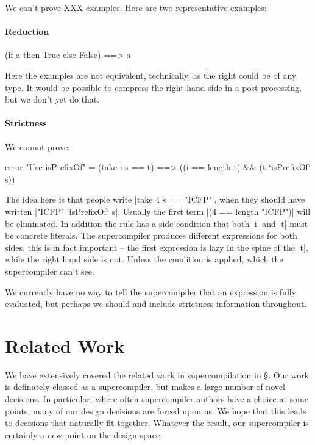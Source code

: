 \documentclass{sigplanconf}
\newcommand{\unknown}{XXX}
\begin{document}
We can't prove \unknown{} examples. Here are two representative examples:

\paragraph{Reduction}

\begin{code}
(if a then True else False) ==> a
\end{code}

Here the examples are not equivalent, technically, as the right could be of any type. It would be possible to compress the right hand side in a post processing, but we don't yet do that.

\paragraph{Strictness}

We cannot prove:

\begin{code}
error "Use isPrefixOf" = (take i s == t) ==> ((i == length t) && (t `isPrefixOf` s))
\end{code}

The idea here is that people write |take 4 s == "ICFP"|, when they should have written |"ICFP" `isPrefixOf` s|. Usually the first term |(4 == length "ICFP")| will be eliminated. In addition the rule has a side condition that both |i| and |t| must be concrete literals. The supercompiler produces different expressions for both sides. this is in fact important -- the first expression is lazy in the spine of the |t|, while the right hand side is not. Unless the condition is applied, which the supercompiler can't see.

We currently have no way to tell the supercompiler that an expression is fully evaluated, but perhaps we should and include strictness information throughout.


\section{Related Work}

We have extensively covered the related work in supercompilation in \S\label{sec:comparison}. Our work is definately classed as a supercompiler, but makes a large number of novel decisions. In particular, where often supercompiler authors have a choice at some points, many of our design decisions are forced upon us. We hope that this leads to decisions that naturally fit together. Whatever the result, our supercompiler is certainly a new point on the design space.
\end{document}
